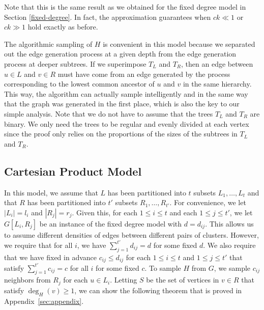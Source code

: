 Note that this is the same result as we obtained for the fixed degree
model in Section \ref{fixed-degree}. In fact, the approximation
guarantees when $ck \ll 1$ or $ck \gg 1$ hold exactly as before.\vs

The algorithmic sampling of $H$ is convenient in this model because we separated
out the edge generation process at a given depth from the edge
generation process at deeper subtrees.
If we superimpose $T_L$
and $T_R$, then an edge between $u\in L$ and $v\in R$ must have
come from an edge generated by the process corresponding to the lowest common ancestor of $u$ and $v$ in the same hierarchy. This way, the algorithm can actually sample intelligently and in the same way that the graph was generated in the first place, which is also the key to our simple analysis. Note
that we do not have to assume that the trees $T_L$ and $T_R$ are
binary. We only need the trees to be regular and evenly divided at
each vertex since the proof only relies on the proportions of the
sizes of the subtrees in $T_L$ and $T_R$.


\subsection{Cartesian Product Model}
\label{cartesian}
In this model, we assume that
$L$ has been partitioned into $t$ subsets $L_1,\ldots, L_t$ and
that $R$ has been partitioned into $t'$ subsets $R_1,\ldots,
R_{t'}$. For convenience, we let $|L_i| = l_i$ and $|R_j|=r_j$. Given
this, for each $1\leq i\leq t$ and each $1\leq j\leq t'$,
we let $G[L_i, R_j]$ be an instance of the fixed degree model with
$d=d_{ij}$. This allows us to assume different densities of edges between different pairs of clusters.
However, we require that for all $i$, we have $\sum_{j=1}^{t'}
d_{ij} = d$ for some fixed $d$. We also require that we have fixed in
advance $c_{ij} \leq d_{ij}$ for each $1\leq i\leq t$ and $1\leq j\leq t'$ that
satisfy $\sum_{j=1}^{t'} c_{ij} = c$ for all $i$ for some fixed $c$.
To sample $H$ from $G$, we sample $c_{ij}$ neighbors from $R_j$ for each
$u\in L_i$. Letting $S$ be the set of vertices in
$v\in R$ that satisfy $\deg_H(v)\geq 1$, we can show the following theorem
that is proved in Appendix~\ref{sec:appendix}.

